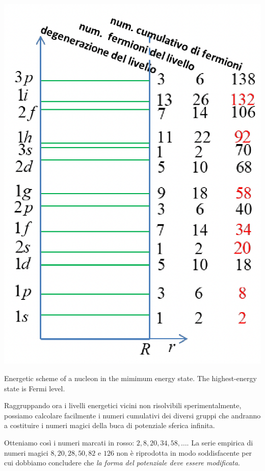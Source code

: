 \begin{marginfigure}
	\includegraphics{figs/energetic-levels-infinite-potential-well}
	\caption{Energetic scheme of a nucleon in the mimimum energy state. The highest-energy state is Fermi level.}
	\label{fig:energetic-levels-infinite-potential-well}
\end{marginfigure}
Raggruppando ora i livelli energetici vicini non risolvibili sperimentalmente, possiamo calcolare facilmente i numeri
cumulativi dei diversi gruppi che andranno a costituire i numeri magici della buca di potenziale sferica infinita.

Otteniamo così i numeri marcati in rosso: $2, 8, 20, 34, 58, \dots$.
La serie empirica di numeri magici $8, 20, 28, 50, 82$ e $126$ non è riprodotta in modo soddisfacente per cui dobbiamo concludere che \emph{la forma del potenziale deve essere modificata}.

